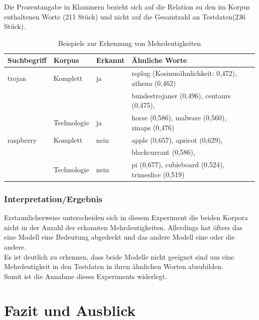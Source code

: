 \documentclass[12pt,a4paper]{report}
\begin{document}
		Die Prozentangabe in Klammern bezieht sich auf die Relation zu den im Korpus enthaltenen Worte (211 Stück) und nicht auf die Gesamtzahl an Testdaten(236 Stück).\\
		
\begin{table}[H]
\caption{Beispiele zur Erkennung von Mehrdeutigkeiten}
\begin{center}
\begin{tabular}{|l||l|l|l|l|}
\hline
Suchbegriff & Korpus & Erkannt & Ähnliche Worte   \\
\hline
\hline
 trojan & Komplett & ja &rsplug (Kosinusähnlichkeit: 0,472), athena (0,462)\\
 &	&	& bundestrojaner (0,496), centaurs (0,475), \\
 &  Technologie & ja & horse (0,586), malware (0,560), zinaps (0,476)\\
 \hline
 
raspberry& Komplett& nein & apple (0,657), apricot (0,629), \\
&&&blackcurrant (0,586),  \\
&Technologie & nein & pi (0,677), cubieboard (0,524), trimeslice (0,519)\\
\hline
 
\end{tabular}
\end{center}
\end{table}
		
		
		\subsection*{Interpretation/Ergebnis}
		Erstaunlicherweise unterscheiden sich in diesem Experiment die beiden Korpora nicht in der Anzahl der erkannten Mehrdeutigkeiten. Allerdings hat öfters das eine Modell eine Bedeutung abgedeckt und das andere Modell eine oder die andere.\\
		Es ist deutlich zu erkennen, dass beide Modelle nicht geeignet sind um eine Mehrdeutigkeit in den Testdaten in ihren ähnlichen Worten abzubilden.\\
		Somit ist die Annahme dieses Experiments widerlegt.
		

\newpage
\chapter{Fazit und Ausblick}
\end{document}
